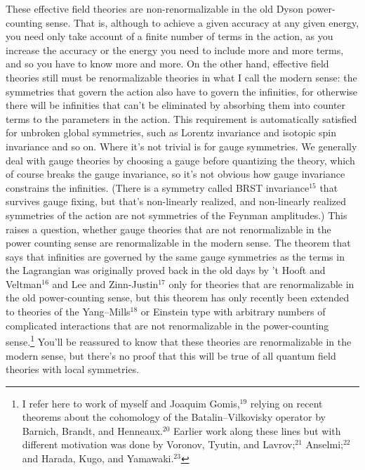 \documentclass[12pt]{article}
\def\fnote#1#2{\begingroup\def\thefootnote{#1}\footnote{#2}
\endgroup}
\begin{document}
These effective field theories are
non-renormalizable in the old Dyson power-counting sense.
That is, although to achieve a given accuracy at any given
energy,  you need only take account of a finite number of
terms in the action, as you increase the accuracy or the
energy you need to include more and more terms,  and so you
have to know more and  more.     On the other hand,
effective field theories still must be renormalizable
theories in what I call the modern sense:  the symmetries
that govern the action also have to govern the infinities,
for otherwise there will be infinities that can't be
eliminated by absorbing them into counter terms to the
parameters in the action.      This requirement is
automatically satisfied for unbroken global symmetries, such
as Lorentz invariance and isotopic spin invariance and so
on. Where it's not trivial is for gauge symmetries. We
generally deal with gauge theories by choosing a gauge
before quantizing the theory, which of course breaks the
gauge invariance, so it's not obvious how gauge invariance
constrains the infinities.   (There is a symmetry called
BRST invariance$^{15}$ that survives gauge fixing, but
that's non-linearly realized, and non-linearly realized
symmetries of
the action are not symmetries of the Feynman amplitudes.)
This raises a question, whether gauge theories that are not
renormalizable in the power counting sense are
renormalizable in the modern sense.   The theorem that says
that infinities are governed by the same gauge symmetries as
the terms in the Lagrangian was originally proved back in
the old days by 't Hooft and Veltman$^{16}$ and Lee and
Zinn-Justin$^{17}$
only for theories that are renormalizable in the old
power-counting sense, but this theorem has only recently
been
extended to theories of the Yang--Mills$^{18}$ or Einstein
type
with arbitrary numbers of complicated interactions that are
not renormalizable in the power-counting
sense.\fnote{$\ddagger$}{I
refer here to work of myself and Joaquim Gomis,$^{19}$
relying on
recent theorems about the cohomology of the
Batalin--Vilkovisky operator by Barnich, Brandt, and
Henneaux.$^{20}$
Earlier work along these lines but with different motivation
was done by Voronov, Tyutin, and Lavrov;$^{21}$
Anselmi;$^{22}$ and
Harada, Kugo, and
Yamawaki.$^{23}$  }   You'll be reassured to know that these
theories are renormalizable in the modern sense, but there's
no proof that this will be true of all quantum field
theories with local symmetries.
\end{document}
